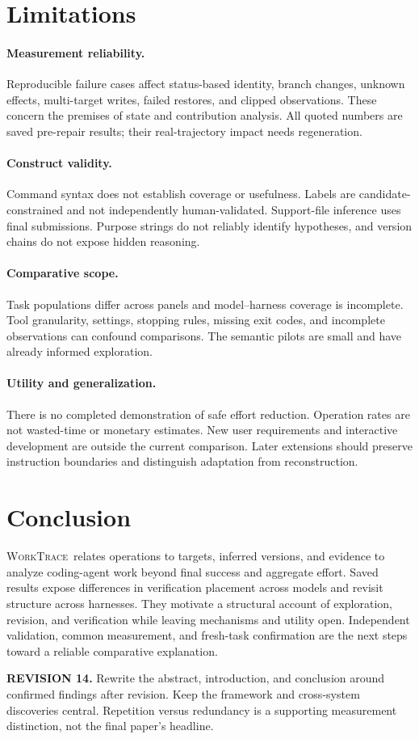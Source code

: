 \documentclass[10pt,a4paper,twocolumn]{article}
\newcommand{\rev}[2]{\par\smallskip\noindent\begin{minipage}{\linewidth}\color{revision}\footnotesize\textbf{REVISION #1.} #2\end{minipage}\par\smallskip}
\newcommand{\wt}{\textsc{WorkTrace}}
\begin{document}
\section{Limitations}
\paragraph{Measurement reliability.}
Reproducible failure cases affect status-based identity, branch changes, unknown effects, multi-target writes, failed restores, and clipped observations. These concern the premises of state and contribution analysis. All quoted numbers are saved pre-repair results; their real-trajectory impact needs regeneration.
\paragraph{Construct validity.}
Command syntax does not establish coverage or usefulness. Labels are candidate-constrained and not independently human-validated. Support-file inference uses final submissions. Purpose strings do not reliably identify hypotheses, and version chains do not expose hidden reasoning.
\paragraph{Comparative scope.}
Task populations differ across panels and model--harness coverage is incomplete. Tool granularity, settings, stopping rules, missing exit codes, and incomplete observations can confound comparisons. The semantic pilots are small and have already informed exploration.
\paragraph{Utility and generalization.}
There is no completed demonstration of safe effort reduction. Operation rates are not wasted-time or monetary estimates. New user requirements and interactive development are outside the current comparison. Later extensions should preserve instruction boundaries and distinguish adaptation from reconstruction.

\section{Conclusion}
\wt\ relates operations to targets, inferred versions, and evidence to analyze coding-agent work beyond final success and aggregate effort. Saved results expose differences in verification placement across models and revisit structure across harnesses. They motivate a structural account of exploration, revision, and verification while leaving mechanisms and utility open. Independent validation, common measurement, and fresh-task confirmation are the next steps toward a reliable comparative explanation.
\rev{14}{Rewrite the abstract, introduction, and conclusion around confirmed findings after revision. Keep the framework and cross-system discoveries central. Repetition versus redundancy is a supporting measurement distinction, not the final paper's headline.}
\end{document}
